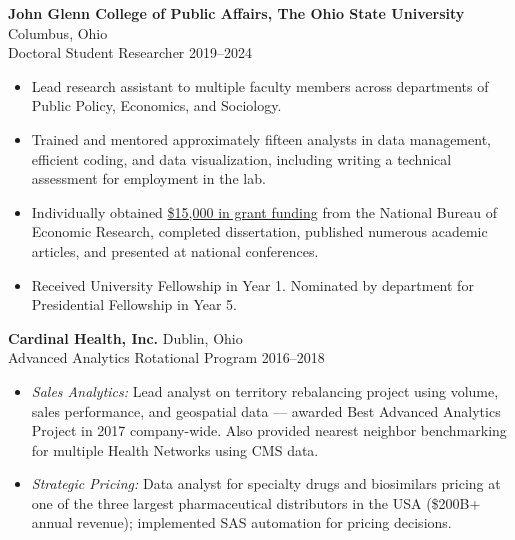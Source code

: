 \medskip
\textbf{John Glenn College of Public Affairs, The Ohio State University} \hfill Columbus, Ohio \\
Doctoral Student Researcher \hfill 2019--2024
\begin{itemize}
    \itemsep0em
    \item Lead research assistant to multiple faculty members across departments of Public Policy, Economics, and Sociology. 
    \item Trained and mentored approximately fifteen analysts in data management, efficient coding, and data visualization, including writing a technical assessment for employment in the lab.
    \item Individually obtained \href{https://www.nber.org/programs-projects/projects-and-centers/8560-impact-household-cancer-diagnosis-investment-higher-education-labor-supply-and-financial?page=1&perPage=50}{\color{lightblue}\$15,000 in grant funding} from the National Bureau of Economic Research, completed dissertation, published numerous academic articles, and presented at national conferences.
    \item Received University Fellowship in Year 1. Nominated by department for Presidential Fellowship in Year 5.
\end{itemize}

\bigskip
\textbf{Cardinal Health, Inc.} \hfill Dublin, Ohio \\
Advanced Analytics Rotational Program \hfill 2016--2018
\begin{itemize}
    \itemsep0em
    \item \textit{Sales Analytics:} Lead analyst on territory rebalancing project using volume, sales performance, and geospatial data — awarded Best Advanced Analytics Project in 2017 company-wide. Also provided nearest neighbor benchmarking for multiple Health Networks using CMS data.
    \item \textit{Strategic Pricing:} Data analyst for specialty drugs and biosimilars pricing at one of the three largest pharmaceutical distributors in the USA (\$200B+ annual revenue); implemented SAS automation for pricing decisions.
\end{itemize}